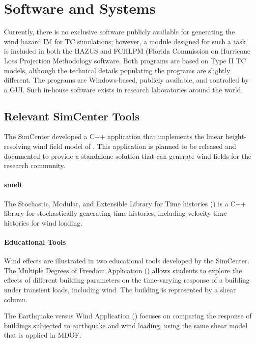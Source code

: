\section{Software and Systems}
\label{sec:storm_wind_tools}

Currently, there is no exclusive software publicly available for generating the wind hazard IM for TC simulations; however, a module designed for such a task is included in both the HAZUS \citep{vickery2006hazusmh} and FCHLPM (Florida Commission on Hurricane Loss Projection Methodology \citep{hamid2010predicting, powell2005state} software. Both programs are based on Type II TC models, although the technical details populating the programs are slightly different. The programs are Windows-based, publicly available, and controlled by a GUI. Such in-house software exists in research laboratories around the world.

\subsection{Relevant SimCenter Tools}

The SimCenter developed a C++ application that implements the linear height-resolving wind field model of \citet{snaiki2017linear}. This application is planned to be released and documented to provide a standalone solution that can generate wind fields for the research community.

\paragraph{smelt} 
The Stochastic, Modular, and Extensible Library for Time histories () is a C++ library for stochastically generating time histories, including velocity time histories for wind loading. 

\paragraph{Educational Tools}
Wind effects are illustrated in two educational tools developed by the SimCenter. The Multiple Degrees of Freedom Application () allows students to explore the effects of different building parameters on the time-varying response of a building under transient loads, including wind. The building is represented by a shear column. 

\noindent The Earthquake versus Wind Application () focuses on comparing the response of buildings subjected to earthquake and wind loading, using the same shear model that is applied in MDOF.
